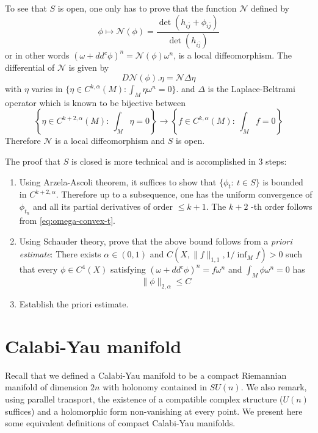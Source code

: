 \documentclass[11pt]{article}
\begin{document}
To see that \(S\) is open, one only has to prove that the function \(\mathcal{N}\) defined by
\[
\phi\mapsto \mathcal{N}(\phi)= \frac{\det(h_{i\bar j} + \phi_{i\bar j})}{\det(h_{i\bar j})}
\]
or in other words \((\omega + dd^c\phi)^n = \mathcal{N}(\phi)\omega^n\), is a local
diffeomorphism. The differential of \(\mathcal{N}\) is given by
\[
D \mathcal{N}(\phi).\eta = \mathcal{N}\Delta\eta
\]
with \(\eta\) varies in \(\{\eta\in C^{k,\alpha}(M):\int_M\eta\omega^n=0\}\). and \(\Delta\) is the
Laplace-Beltrami operator which is known to be bijective between
\[
\left\{\eta\in C^{k+2,\alpha}(M):\ \int_M\eta = 0\right\} \longrightarrow \left\{f\in C^{k,\alpha}(M):\ \int_M f=0\right\}
\]
Therefore \(\mathcal{N}\) is a local diffeomorphism and \(S\) is open.

The proof that \(S\) is closed is more technical and is accomplished in 3 steps:
\begin{enumerate}
\item Using Arzela-Ascoli theorem, it suffices to show that \(\{\phi_t:\ t\in S\}\) is bounded in
\(C^{k+2,\alpha}\). Therefore up to a subsequence, one has the uniform convergence of \(\phi_{t_n}\)
and all its partial derivatives of order \(\leq k+1\). The \(k+2\) -th order follows from \eqref{eq:omega-convex-t}.
\item Using Schauder theory, prove that the above bound follows from a \emph{priori estimate}: There exists
\(\alpha\in (0,1)\) and \(C(X,\|f\|_{1,1}, 1/\inf_M f)>0\) such that every \(\phi\in C^4(X)\)
satisfying \((\omega +dd^c\phi)^n = f\omega^n\) and \(\int_M \phi\omega^n=0\) has \[\|
   \phi\|_{2,\alpha} \leq C\]
\item Establish the priori estimate.
\end{enumerate}








\section{Calabi-Yau manifold}
\label{sec:org260b8b3}
Recall that we defined a Calabi-Yau manifold to be a compact Riemannian manifold of dimension \(2n\)
with holonomy contained in \(SU(n)\). We also remark, using parallel transport, the existence of a compatible
complex structure (\(U(n)\) suffices) and a holomorphic form non-vanishing at every point. We present
here some equivalent definitions of compact Calabi-Yau manifolds.
\end{document}
